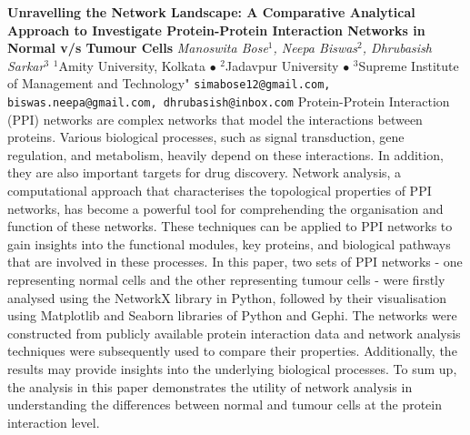 
    \begin{conf-abstract}[]
        {\textbf{Unravelling the Network Landscape: A Comparative Analytical Approach to Investigate Protein-Protein Interaction Networks in Normal v/s Tumour Cells}}
        {\textit{Manoswita Bose$^{1}$, Neepa Biswas$^{2}$, Dhrubasish Sarkar$^{3}$}}
        {$^{1}$Amity University, Kolkata $\bullet$ $^{2}$Jadavpur University $\bullet$ $^{3}$Supreme Institute of Management and Technology"}
        {\texttt{simabose12@gmail.com, biswas.neepa@gmail.com, dhrubasish@inbox.com}}
        {Protein-Protein Interaction (PPI) networks are complex networks that model the interactions between proteins. Various biological processes, such as signal transduction, gene regulation, and metabolism, heavily depend on these interactions. In addition, they are also important targets for drug discovery. Network analysis, a computational approach that characterises the topological properties of PPI networks, has become a powerful tool for comprehending the organisation and function of these networks. These techniques can be applied to PPI networks to gain insights into the functional modules, key proteins, and biological pathways that are involved in these processes.  In this paper, two sets of PPI networks - one representing normal cells and the other representing tumour cells - were firstly analysed using the NetworkX library in Python, followed by their visualisation using Matplotlib and Seaborn libraries of Python and Gephi. The networks were constructed from publicly available protein interaction data and network analysis techniques were subsequently used to compare their properties. Additionally, the results may provide insights into the underlying biological processes. To sum up, the analysis in this paper demonstrates the utility of network analysis in understanding the differences between normal and tumour cells at the protein interaction level. }
    \end{conf-abstract}
        